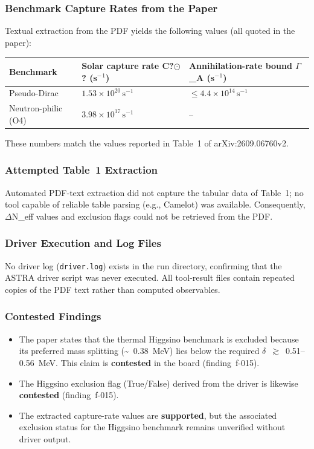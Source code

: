 \documentclass[11pt,a4paper]{article}
\begin{document}
\subsubsection{Benchmark Capture Rates from the Paper}
Textual extraction from the PDF yields the following values (all quoted in the paper):

\begingroup
\begin{longtable}{@{}p{}p{}p{}@{}}
\toprule
\textbf{Benchmark} & \textbf{Solar capture rate C?$\odot$? (s$^-$$^1$)} & \textbf{Annihilation-rate bound $\Gamma$\_A (s$^-$$^1$)} \\ \midrule \endhead
Pseudo-Dirac & $1.53\times10^{20}\,\mathrm{s^{-1}}$ & $\le 4.4\times10^{14}\,\mathrm{s^{-1}}$ \\
Neutron-philic (O4) & $3.98\times10^{17}\,\mathrm{s^{-1}}$ & -- \\
\bottomrule\end{longtable}\endgroup
These numbers match the values reported in Table~1 of arXiv:2609.06760v2.





\subsubsection{Attempted Table~1 Extraction}
Automated PDF-text extraction did not capture the tabular data of Table~1; no tool capable of reliable table parsing (e.g., Camelot) was available. Consequently, $\Delta$N\_eff values and exclusion flags could not be retrieved from the PDF.





\subsubsection{Driver Execution and Log Files}
No driver log (\texttt{driver.log}) exists in the run directory, confirming that the ASTRA driver script was never executed. All tool-result files contain repeated copies of the PDF text rather than computed observables.





\subsubsection{Contested Findings}
\begin{itemize}
  \item The paper states that the thermal Higgsino benchmark is excluded because its preferred mass splitting (\textasciitilde{}~0.38~MeV) lies below the required $\delta$~$\gtrsim$~0.51--0.56~MeV. This claim is \textbf{contested} in the board (finding~f-015).
  \item The Higgsino exclusion flag (True/False) derived from the driver is likewise \textbf{contested} (finding~f-015).
  \item The extracted capture-rate values are \textbf{supported}, but the associated exclusion status for the Higgsino benchmark remains unverified without driver output.
\end{itemize}
\end{document}
